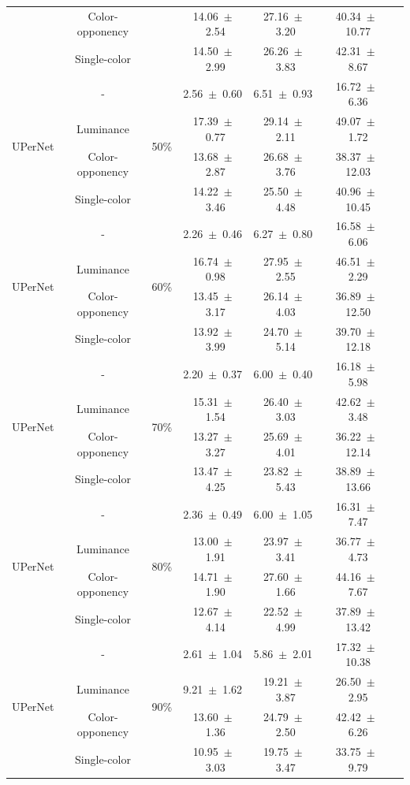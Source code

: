\begin{table}[h]
\begin{tabular}{@{}lccc ccc@{}}
& Color-opponency & & 14.06~$\pm$~2.54 & 27.16~$\pm$~3.20 & 40.34~$\pm$~10.77 \\
& Single-color & & 14.50~$\pm$~2.99 & 26.26~$\pm$~3.83 & 42.31~$\pm$~8.67 \\
\midrule
\multirow{4}{*}{UPerNet} & - & \multirow{4}{*}{50\%} & 2.56~$\pm$~0.60 & 6.51~$\pm$~0.93 & 16.72~$\pm$~6.36 \\
& Luminance & & 17.39~$\pm$~0.77 & 29.14~$\pm$~2.11 & 49.07~$\pm$~1.72 \\
& Color-opponency & & 13.68~$\pm$~2.87 & 26.68~$\pm$~3.76 & 38.37~$\pm$~12.03 \\
& Single-color & & 14.22~$\pm$~3.46 & 25.50~$\pm$~4.48 & 40.96~$\pm$~10.45 \\
\midrule
\multirow{4}{*}{UPerNet} & - & \multirow{4}{*}{60\%} & 2.26~$\pm$~0.46 & 6.27~$\pm$~0.80 & 16.58~$\pm$~6.06 \\
& Luminance & & 16.74~$\pm$~0.98 & 27.95~$\pm$~2.55 & 46.51~$\pm$~2.29 \\
& Color-opponency & & 13.45~$\pm$~3.17 & 26.14~$\pm$~4.03 & 36.89~$\pm$~12.50 \\
& Single-color & & 13.92~$\pm$~3.99 & 24.70~$\pm$~5.14 & 39.70~$\pm$~12.18 \\
\midrule
\multirow{4}{*}{UPerNet} & - & \multirow{4}{*}{70\%} & 2.20~$\pm$~0.37 & 6.00~$\pm$~0.40 & 16.18~$\pm$~5.98 \\
& Luminance & & 15.31~$\pm$~1.54 & 26.40~$\pm$~3.03 & 42.62~$\pm$~3.48 \\
& Color-opponency & & 13.27~$\pm$~3.27 & 25.69~$\pm$~4.01 & 36.22~$\pm$~12.14 \\
& Single-color & & 13.47~$\pm$~4.25 & 23.82~$\pm$~5.43 & 38.89~$\pm$~13.66 \\
\midrule
\multirow{4}{*}{UPerNet} & - & \multirow{4}{*}{80\%} & 2.36~$\pm$~0.49 & 6.00~$\pm$~1.05 & 16.31~$\pm$~7.47 \\
& Luminance & & 13.00~$\pm$~1.91 & 23.97~$\pm$~3.41 & 36.77~$\pm$~4.73 \\
& Color-opponency & & 14.71~$\pm$~1.90 & 27.60~$\pm$~1.66 & 44.16~$\pm$~7.67 \\
& Single-color & & 12.67~$\pm$~4.14 & 22.52~$\pm$~4.99 & 37.89~$\pm$~13.42 \\
\midrule
\multirow{4}{*}{UPerNet} & - & \multirow{4}{*}{90\%} & 2.61~$\pm$~1.04 & 5.86~$\pm$~2.01 & 17.32~$\pm$~10.38 \\
& Luminance & & 9.21~$\pm$~1.62 & 19.21~$\pm$~3.87 & 26.50~$\pm$~2.95 \\
& Color-opponency & & 13.60~$\pm$~1.36 & 24.79~$\pm$~2.50 & 42.42~$\pm$~6.26 \\
& Single-color & & 10.95~$\pm$~3.03 & 19.75~$\pm$~3.47 & 33.75~$\pm$~9.79 \\
\midrule
\bottomrule
\end{tabular}
\label{tab:sparse_results_upernet_dark_zurich}
\end{table}